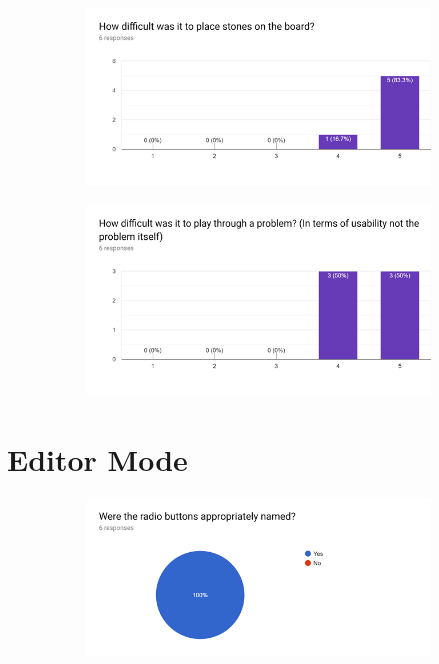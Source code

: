 \documentclass{l4proj}
\begin{document}
\begin{appendices}
\begin{figure}[H]
\centering
\begin{subfigure}[b]{\textwidth}
\centering
\includegraphics[width=\textwidth]{A1/8.png}
\end{subfigure}
\end{figure}


\begin{figure}[H]
\centering
\begin{subfigure}[b]{\textwidth}
\centering
\includegraphics[width=\textwidth]{A1/9.png}
\end{subfigure}
\end{figure}

\section{Editor Mode}

\begin{figure}[H]
\centering
\begin{subfigure}[b]{\textwidth}
\centering
\includegraphics[width=\textwidth]{A1/10.png}
\end{subfigure}
\end{figure}



\end{appendices}
\end{document}
